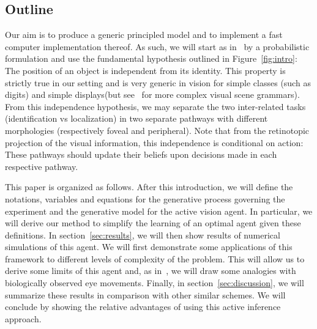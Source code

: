\subsection{Outline}



\fi Our aim is to produce a generic principled model and to implement a fast computer implementation thereof. As such, we will start as in~\citep{Friston12} by a probabilistic formulation and use the fundamental hypothesis outlined in Figure~\ref{fig:intro}: The position of an object is independent from its identity. This property is strictly true in our setting and is very generic in vision for simple classes (such as digits) and simple displays\CNS (but see~\citep{Vo12} for more complex visual scene grammars)\fi . From this independence hypothesis, we may separate the two inter-related tasks (identification vs localization) in two separate pathways with different morphologies (respectively foveal and peripheral). Note that from the retinotopic projection of the visual information, this independence is conditional on action: These pathways should update their beliefs upon decisions made in each respective pathway.

\CNS
This paper is organized as follows. After this introduction, we will define the notations, variables and equations for the generative process governing the experiment and the generative model for the active vision agent. In particular, we will derive our method to simplify the learning of an optimal agent given these definitions. In section~\ref{sec:results}, we will then show results of numerical simulations of this agent. We will first demonstrate some applications of this framework to different levels of complexity of the problem. This will allow us to derive some limits of this agent and, as in~\citep{Najemnik05}, we will draw some analogies with biologically observed eye movements. Finally, in section~\ref{sec:discussion}, we will summarize these results in comparison with other similar schemes. We will conclude by showing the relative advantages of using this active inference approach.
\fi